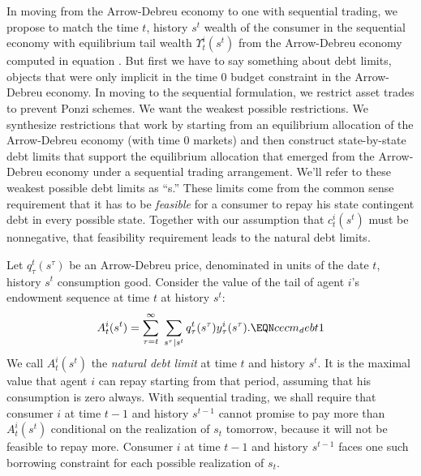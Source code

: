 In moving from  the Arrow-Debreu economy to one with sequential
trading, we propose to  match  the time $t$, history $s^{t}$ wealth of
the consumer  in the sequential economy with  equilibrium  tail wealth
$\Upsilon^i_t(s^t)$ from the Arrow-Debreu economy computed in equation
. But first we have to say something about debt
limits, objects that were  only implicit in the time $0$ budget constraint  in the Arrow-Debreu economy.
In moving to the sequential formulation, we    restrict asset trades to prevent Ponzi schemes.  We
want the weakest possible restrictions.  We
synthesize restrictions that work by starting from an equilibrium
allocation of the Arrow-Debreu economy (with time $0$ markets) and then construct  state-by-state debt limits that support
the equilibrium allocation that emerged from the Arrow-Debreu economy under a sequential trading arrangement.
 We'll refer to these weakest possible
debt limits as  ``s.'' These limits come
from the common sense requirement that it has to be {\it
feasible\/} for a consumer to repay his state contingent debt in
every possible state.
Together with  our assumption that $c_t^i(s^t)$ must be nonnegative, that
feasibility requirement leads to the natural debt limits.




Let $q_\tau^t(s^\tau)$ be an Arrow-Debreu price, denominated  in
units of the date $t$, history
 $s^t$  consumption good.
Consider the value of the tail of  agent $i$'s endowment sequence
at time $t$ at history $s^t$:
$$ A^i_t(s^t) =
   \sum_{\tau=t}^\infty \; \sum_{s^\tau \vert s^t}
    q^t_\tau(s^\tau) y_\tau^i(s^\tau).   \EQN cecm_debt1$$
 We call
$A^i_t(s^t)$ the {\it natural debt limit} at time $t$ and history
$s^t$. It is the  maximal value that agent $i$   can
repay starting from that period, assuming that his consumption is
zero always.
With sequential trading, we shall require that consumer $i$ at time $t-1$ and
history $s^{t-1}$ cannot promise to pay more than $A^i_t(s^t)$
conditional on the realization of $s_t$ tomorrow, because it will
not be feasible to repay more. Consumer $i$ at
time $t-1$ and history $s^{t-1}$ faces one such borrowing constraint for each possible
realization of $s_t$.


